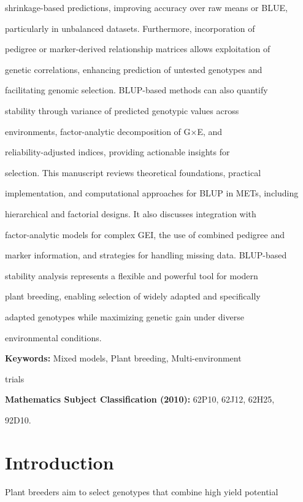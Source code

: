 \documentclass[10pt,twoside]{article}
\numberwithin{equation}{section}
\begin{document}
shrinkage-based predictions, improving accuracy over raw means or BLUE,

particularly in unbalanced datasets. Furthermore, incorporation of

pedigree or marker-derived relationship matrices allows exploitation of

genetic correlations, enhancing prediction of untested genotypes and

facilitating genomic selection. BLUP-based methods can also quantify

stability through variance of predicted genotypic values across

environments, factor-analytic decomposition of G×E, and

reliability-adjusted indices, providing actionable insights for

selection. This manuscript reviews theoretical foundations, practical

implementation, and computational approaches for BLUP in METs, including

hierarchical and factorial designs. It also discusses integration with

factor-analytic models for complex GEI, the use of combined pedigree and

marker information, and strategies for handling missing data. BLUP-based

stability analysis represents a flexible and powerful tool for modern

plant breeding, enabling selection of widely adapted and specifically

adapted genotypes while maximizing genetic gain under diverse

environmental conditions.



\textbf{Keywords:} Mixed models, Plant breeding, Multi-environment

trials



\textbf{Mathematics Subject Classification (2010):} 62P10, 62J12, 62H25,

92D10.



\section{Introduction}



Plant breeders aim to select genotypes that combine high yield potential
\end{document}
